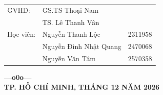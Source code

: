 \begin{titlepage}
\begin{center}
    \bfseries
    \fontsize{14}{16}\selectfont
    \renewcommand{\arraystretch}{1.25}
    \begin{tabular}{@{}l l r@{}}
        GVHD:     & \multicolumn{2}{l}{GS.TS Thoại Nam} \\
                  & \multicolumn{2}{l}{TS. Lê Thanh Vân} \\[4pt]
        Học viên: & Nguyễn Thanh Lộc       & 2311958 \\
                  & Nguyễn Đinh Nhật Quang & 2470068 \\
                  & Nguyễn Văn Tâm         & 2570358 \\
    \end{tabular}
\end{center}
\begin{center}
    \vspace{0.4cm}
    {\textbf{---o0o---}}\\
    \vspace{0.3cm}
    {\textbf{TP. HỒ CHÍ MINH, THÁNG 12 NĂM 2026}}
\end{center}

\end{titlepage}
